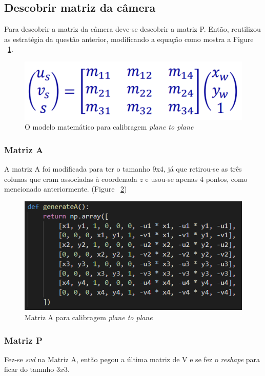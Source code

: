 \documentclass{article}
\begin{document}
    \subsection{Descobrir matriz da câmera}
    Para descobrir a matriz da câmera deve-se descobrir a matriz P. Então, reutilizou as estratégia da questão anterior, modificando a equação como mostra a Figure ~\ref{fig:planeToPlane}.
    \begin{figure}[h!]
    \centering
    \includegraphics[scale=0.6]{planeToPlane.PNG}
    \caption{O modelo matemático para calibragem \textit{plane to plane}}
    \label{fig:planeToPlane}
    \end{figure}

        \subsubsection{Matriz A}
        A matriz A foi modificada para ter o tamanho 9x4, já que retirou-se as três colunas que eram associadas à coordenada \(z\) e usou-se apenas 4 pontos, como mencionado anteriormente. (Figure ~\ref{fig:matrizA})

        \begin{figure}[h!]
        \centering
        \includegraphics[scale=1]{matrizA.PNG}
        \caption{Matriz A para calibragem \textit{plane to plane}}
        \label{fig:matrizA}
        \end{figure}

        \subsubsection{Matriz P}
        Fez-se \textit{svd} na Matriz A, então pegou a última matriz de V e se fez o \textit{reshape} para ficar do tamnho \(3x3\).
\end{document}
